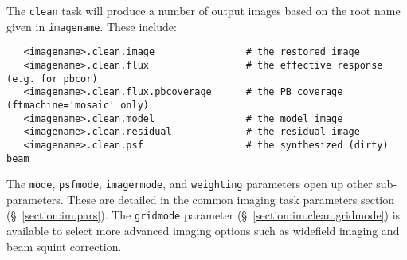 The {\tt clean} task will produce a number of output images based
on the root name given in {\tt imagename}.  
These include:
\small
\begin{verbatim}
   <imagename>.clean.image                # the restored image
   <imagename>.clean.flux                 # the effective response (e.g. for pbcor)
   <imagename>.clean.flux.pbcoverage      # the PB coverage (ftmachine='mosaic' only)
   <imagename>.clean.model                # the model image
   <imagename>.clean.residual             # the residual image
   <imagename>.clean.psf                  # the synthesized (dirty) beam
\end{verbatim}


The {\tt mode}, {\tt psfmode}, {\tt imagermode}, and {\tt weighting}
parameters open up other sub-parameters.  These are detailed
in the common imaging task parameters section
(\S~\ref{section:im.pars}).  The {\tt gridmode} parameter
(\S~\ref{section:im.clean.gridmode}) is available to select more
advanced imaging options such as widefield imaging and beam squint
correction.

